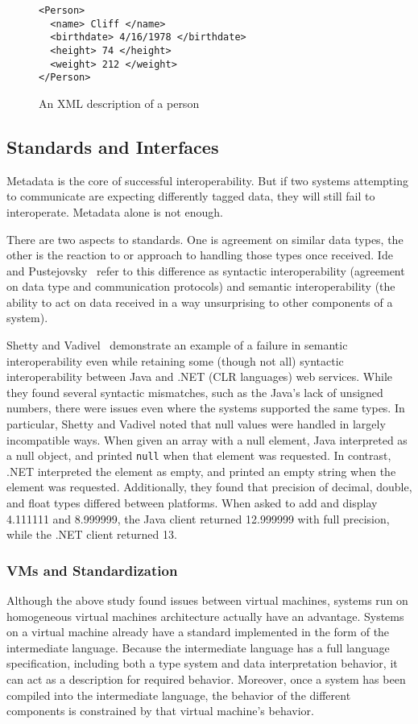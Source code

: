 \documentclass{sig-alternate}
\begin{document}
\begin{figure}
\begin{verbatim}
<Person>
  <name> Cliff </name>
  <birthdate> 4/16/1978 </birthdate>
  <height> 74 </height>
  <weight> 212 </weight>
</Person>
\end{verbatim}
\caption{An XML description of a person}
\label{XMLexample}
\end{figure}

\subsection{Standards and Interfaces}\label{standards}
Metadata is the core of successful interoperability. But if two systems attempting to communicate are expecting differently tagged data, they will still fail to interoperate. Metadata alone is not enough.

There are two aspects to standards. One is agreement on similar data types, the other is the reaction to or approach to handling those types once received. Ide and Pustejovsky~\cite{Ide:2010} refer to this difference as syntactic interoperability (agreement on data type and communication protocols) and semantic interoperability (the ability to act on data received in a way unsurprising to other components of a system).

Shetty and Vadivel~\cite{Shetty:2009} demonstrate an example of a failure in semantic interoperability even while retaining some (though not all) syntactic interoperability between Java and .NET (CLR languages) web services.
While they found several syntactic mismatches, such as the Java's lack of unsigned numbers, there were issues even where the systems supported the same types. In particular, Shetty and Vadivel noted that null values were handled in largely incompatible ways. When given an array with a null element, Java interpreted as a null object, and printed {\tt null} when that element was requested. In contrast, .NET interpreted the element as empty, and printed an empty string when the element was requested. 
Additionally, they found that precision of decimal, double, and float types differed between platforms. When asked to add and display 4.111111 and 8.999999, the Java client returned 12.999999 with full precision, while the .NET client returned 13. 


\subsubsection*{VMs and Standardization}
Although the above study found issues between virtual machines, systems run on homogeneous virtual machines architecture actually have an advantage. Systems on a virtual machine already have a standard implemented in the form of the intermediate language. Because the intermediate language has a full language specification, including both a type system and data interpretation behavior, it can act as a description for required behavior. Moreover, once a system has been compiled into the intermediate language, the behavior of the different components is constrained by that virtual machine's behavior.
\end{document}
